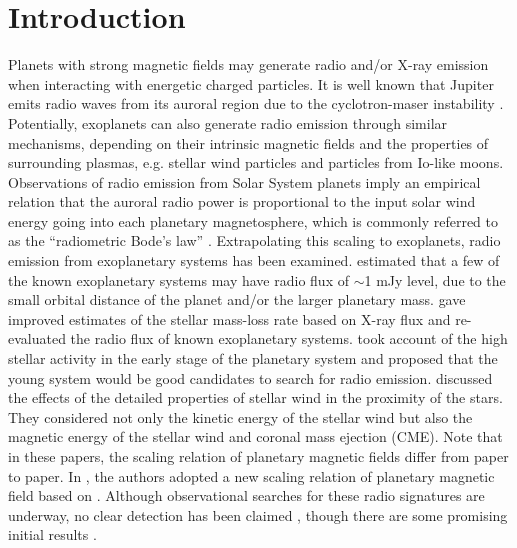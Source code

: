 \documentclass[iop,numberedappendix,apj]{emulateapj}
\begin{document}
  


\section{Introduction}
\label{sec:intro}


Planets with strong magnetic fields may generate radio and/or X-ray emission when interacting with energetic charged particles. 
It is well known that Jupiter emits radio waves from its auroral region due to the cyclotron-maser instability \citep[e.g.][]{wu1979,zarka1998}.  Potentially, exoplanets can also generate radio emission through similar mechanisms, depending on their intrinsic magnetic fields and the properties of surrounding plasmas, e.g. stellar wind particles and particles from Io-like moons. 
Observations of radio emission from Solar System planets imply an empirical relation that the auroral radio power is proportional to the input solar wind energy going into each planetary magnetosphere, which is commonly referred to as the ``radiometric Bode's law'' \citep{desch+kaiser1984,zarka2001}. 
Extrapolating this scaling to exoplanets, radio emission from exoplanetary systems has been examined. 
\citet{farrell1999,zarka2001,lazio2004} estimated that a few of the known exoplanetary systems may have radio flux of $\sim $1 mJy level, due to the small orbital distance of the planet and/or the larger planetary mass. 
\citet{stevens2005} gave improved estimates of the stellar mass-loss rate based on X-ray flux and re-evaluated the radio flux of known exoplanetary systems. 
\citet{griesmeier2005} took account of the high stellar activity in the early stage of the planetary system and proposed that the young system would be good candidates to search for radio emission. 
\citet{griesmeier2007a, griesmeier2007b} discussed the effects of the detailed properties of stellar wind in the proximity of the stars. They considered not only the kinetic energy of the stellar wind but also the magnetic energy of the stellar wind and coronal mass ejection (CME). 
Note that in these papers, the scaling relation of planetary magnetic fields differ from paper to paper.
In \citet{reiners2010}, the authors adopted a new scaling relation of planetary magnetic field based on \citet{christensen_et_al2009}. 
Although observational searches for these radio signatures are underway, no clear detection has been claimed \citep{bastian2000,george2007,stroe2012,hallinan2013,murphy2015}, though there are some promising initial results \citep{lecavelier_et_al2013,sirothia2014}.
\end{document}
